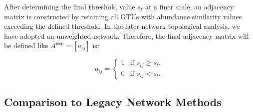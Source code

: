\noindent After determining the final threshold value $s_t$ at a finer scale, an adjacency matrix is constructed by retaining all OTUs with abundance similarity values exceeding the defined threshold.
In the later network topological analysis, we have adopted an unweighted network.
Therefore, the final adjacency matrix will be defined like $A^{pxp}=[a_{ij}]$ is:

\[a_{ij} =
\begin{cases}
1 & \text{if } s_{ij} \geq s_t, \\
0 & \text{if } s_{ij} < s_t.
\end{cases}\]

\subsection{Comparison to Legacy Network Methods}\label{subsec:comparison-to-legacy-network-methods}
